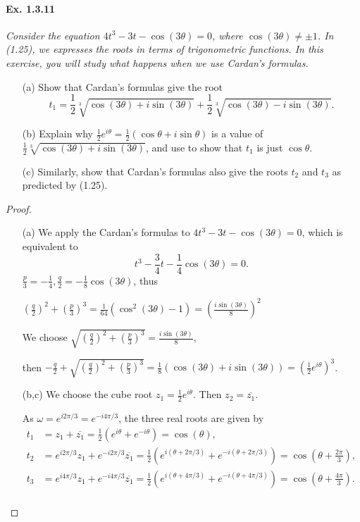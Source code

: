 \documentclass[11pt,a4paper]{article}
\begin{document}
\paragraph{Ex. 1.3.11}

{\it Consider the equation $4t^3 - 3t - \cos(3\theta) = 0$, where $\cos(3\theta) \neq \pm 1$. In (1.25), we expresses the roots in terms of trigonometric functions. In this exercise, you will study what happens when we use Cardan's formulas.
\begin{enumerate}
\item[(a)] Show that Cardan's formulas give the root
$$t_1 = \frac{1}{2} \sqrt[3]{\cos(3\theta) + i \sin(3\theta)} + \frac{1}{2} \sqrt[3]{\cos(3\theta) - i \sin(3\theta)}.$$
\item[(b)] Explain why $\frac{1}{2} e^{i\theta} = \frac{1}{2} (\cos \theta + i \sin \theta)$ is a value of $\frac{1}{2} \sqrt[3]{\cos(3\theta) + i \sin(3\theta)}$, and use to show that $t_1$ is just $\cos \theta$.
\item[(c)] Similarly, show that Cardan's formulas also give the roots $t_2$ and $t_3$ as predicted by (1.25).
\end{enumerate}
}

\begin{proof}
\begin{enumerate}

\item[(a)] We apply the Cardan's formulas to $4 t^3 - 3 t -\cos(3\theta) = 0$, which is equivalent to
$$t^3 - \frac{3}{4} t -\frac{1}{4}\cos(3\theta) = 0.$$
$\frac{p}{3} = -\frac{1}{4}, \frac{q}{2} = -\frac{1}{8} \cos(3\theta)$, thus

$\left( \frac{q}{2}\right)^2 + \left ( \frac{p}{3} \right)^3 = \frac{1}{64} (\cos^2(3\theta) - 1) =\left( \frac{i \sin(3\theta)}{8} \right)^2 $



We choose $\sqrt{\left( \frac{q}{2}\right)^2 + \left ( \frac{p}{3} \right)^3} =  \frac{i \sin(3\theta)}{8}$,

then $-\frac{q}{2}+\sqrt{\left( \frac{q}{2}\right)^2 + \left ( \frac{p}{3} \right)^3} = \frac{1}{8}( \cos(3\theta) + i \sin(3 \theta)) = \left (\frac{1}{2} e^{i \theta} \right )^3$.


\item[(b,c)] 
We choose the cube root $z_1 = \frac{1}{2} e^{i \theta}$. 
Then $z_2 = \overline{z_1}$.

As $\omega =  e^{i 2 \pi/3} = e^{-i4\pi/3}$, the three real roots are given by
\begin{align*}
t_1 &= z_1 + \overline{z_1} = \frac{1}{2} (e^{i \theta} + e^{-i\theta}) = \cos (\theta),\\
t_2&= e^{i 2 \pi/3} z_1 + e^{-i2\pi/3} \overline{z_1}=\frac{1}{2} (e^{i (\theta + 2\pi/3)} + e^{-i(\theta+ 2\pi/3)}) = \cos\left(\theta + \frac{2\pi}{3}\right),\\
t_3&= e^{i 4 \pi/3} z_1 + e^{-i4\pi/3} \overline{z_1}=\frac{1}{2} (e^{i (\theta + 4\pi/3)} + e^{-i(\theta+ 4\pi/3)}) = \cos\left(\theta + \frac{4\pi}{3}\right).\\
\end{align*}
\end{enumerate}
\end{proof}
\end{document}
